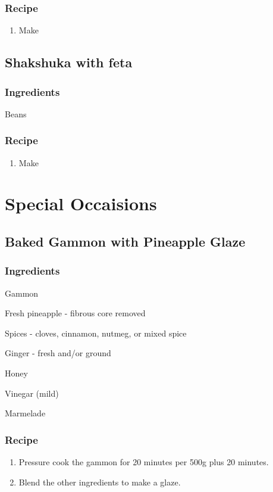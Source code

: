 \subsection*{Recipe}
\begin{enumerate}
    \item Make
\end{enumerate}

\newpage
\section{Shakshuka with feta}
\subsection*{Ingredients}
\begin{ingredients}
    \item Beans
\end{ingredients}
\subsection*{Recipe}
\begin{enumerate}
    \item Make
\end{enumerate}

\newpage
\clearpage
\chapter{Special Occaisions}
\section{Baked Gammon with Pineapple Glaze}
\subsection*{Ingredients}
\begin{ingredients}
    \item Gammon
    \item Fresh pineapple - fibrous core removed
    \item Spices - cloves, cinnamon, nutmeg, or mixed spice
    \item Ginger - fresh and/or ground
    \item Honey
    \item Vinegar (mild)
    \item Marmelade
\end{ingredients}
\subsection*{Recipe}
\begin{enumerate}
    \item Pressure cook the gammon for 20 minutes per 500g plus 20 minutes.
    \item Blend the other ingredients to make a glaze.
\end{enumerate}

\newpage